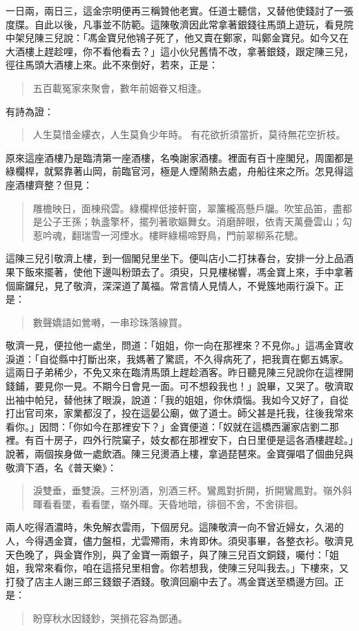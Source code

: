 一日兩，兩日三，這金宗明便再三稱贊他老實。任道士聽信，又替他使錢討了一張度牒。自此以後，凡事並不防範。這陳敬濟因此常拿著銀錢往馬頭上遊玩，看見院中架兒陳三兒說：「馮金寶兒他鴇子死了，他又賣在鄭家，叫鄭金寶兒。如今又在大酒樓上趕趁哩，你不看他看去？」這小伙兒舊情不改，拿著銀錢，跟定陳三兒，徑往馬頭大酒樓上來。此不來倒好，若來，正是：
\begin{quote}
五百載冤家來聚會，數年前姻眷又相逢。
\end{quote}
有詩為證：
\begin{quote}
人生莫惜金縷衣，人生莫負少年時。
有花欲折須當折，莫待無花空折枝。
\end{quote}

原來這座酒樓乃是臨清第一座酒樓，名喚謝家酒樓。裡面有百十座閣兒，周圍都是綠欄桿，就緊靠著山岡，前臨官河，極是人煙鬧熱去處，舟船往來之所。怎見得這座酒樓齊整？但見：
\begin{quote}
雕檐映日，面棟飛雲。綠欄桿低接軒窗，翠簾櫳高懸戶牖。吹笙品笛，盡都是公子王孫；執盞擎杯，擺列著歌嫗舞女。消磨醉眼，依青天萬疊雲山；勾惹吟魂，翻瑞雪一河煙水。樓畔綠楊啼野鳥，門前翠柳系花驄。
\end{quote}

這陳三兒引敬濟上樓，到一個閣兒里坐下。便叫店小二打抹春台，安排一分上品酒果下飯來擺著，使他下邊叫粉頭去了。須臾，只見樓梯響，馮金寶上來，手中拿著個廝鑼兒，見了敬濟，深深道了萬福。常言情人見情人，不覺簇地兩行淚下。正是：
\begin{quote}
數聲嬌語如鶯囀，一串珍珠落線買。
\end{quote}

敬濟一見，便拉他一處坐，問道：「姐姐，你一向在那裡來？不見你。」這馮金寶收淚道：「自從縣中打斷出來，我媽著了驚謊，不久得病死了，把我賣在鄭五媽家。這兩日子弟稀少，不免又來在臨清馬頭上趕趁酒客。昨日聽見陳三兒說你在這裡開錢鋪，要見你一見。不期今日會見一面。可不想殺我也！」說畢，又哭了。敬濟取出袖中帕兒，替他抹了眼淚，說道：「我的姐姐，你休煩惱。我如今又好了，自從打出官司來，家業都沒了，投在這晏公廟，做了道士。師父甚是托我，往後我常來看你。」因問：「你如今在那裡安下？」金寶便道：「奴就在這橋西灑家店劉二那裡。有百十房子，四外行院窠子，妓女都在那裡安下，白日里便是這各酒樓趕趁。」說著，兩個挨身做一處飲酒。陳三兒燙酒上樓，拿過琵琶來。金寶彈唱了個曲兒與敬濟下酒，名《普天樂》：
\begin{quote}
淚雙垂，垂雙淚。三杯別酒，別酒三杯。鸞鳳對折開，折開鸞鳳對。嶺外斜暉看看墜，看看墜，嶺外暉。天昏地暗，徘徊不舍，不舍徘徊。
\end{quote}

兩人吃得酒濃時，朱免解衣雲雨，下個房兒。這陳敬濟一向不曾近婦女，久渴的人，今得遇金寶，儘力盤桓，尤雲殢雨，未肯即休。須臾事畢，各整衣衫。敬濟見天色晚了，與金寶作別，與了金寶一兩銀子，與了陳三兒百文銅錢，囑付：「姐姐，我常來看你，咱在這搭兒里相會。你若想我，使陳三兒叫我去。」下樓來，又打發了店主人謝三郎三錢銀子酒錢。敬濟回廟中去了。馮金寶送至橋邊方回。正是：
\begin{quote}
盼穿秋水因錢鈔，哭損花容為鄧通。
\end{quote}
